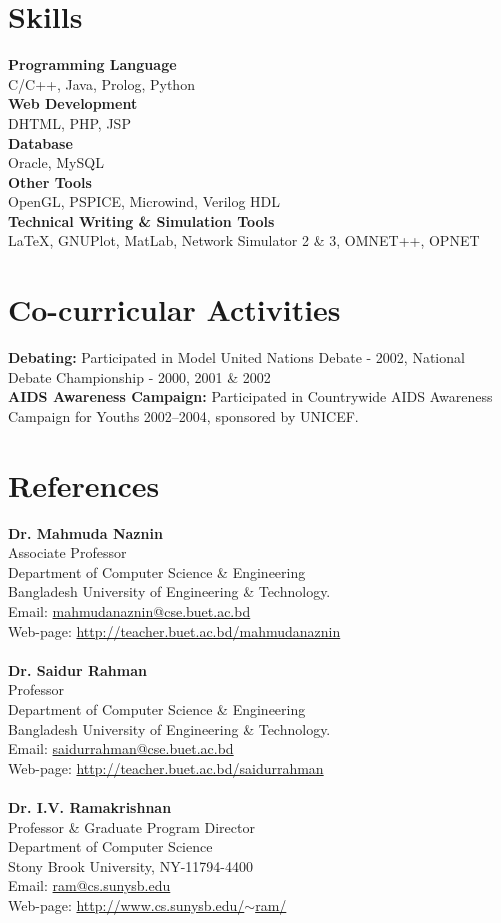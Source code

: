 \documentclass[margin,line,pifont,palatino,courier]{res}
\begin{document}
\begin{resume}
\section{\sc Skills}
\textbf{Programming Language}\\
C/C++, Java, Prolog, Python\\
\textbf{Web Development}\\
DHTML, PHP, JSP\\
\textbf{Database}\\ 
Oracle, MySQL\\
\textbf{Other Tools}\\
OpenGL, PSPICE, Microwind, Verilog HDL\\
\textbf{Technical Writing \& Simulation Tools}\\
\LaTeX{}, GNUPlot, MatLab, Network Simulator 2 \& 3, OMNET++, OPNET
\section{\sc Co-curricular Activities}
\textbf{Debating: }Participated in Model United Nations Debate - 2002, National Debate Championship
- 2000, 2001 \& 2002\\
\textbf{AIDS Awareness Campaign: }Participated in Countrywide AIDS Awareness Campaign for Youths
2002--2004, sponsored by UNICEF.
\section{\sc References}
\textbf{Dr. Mahmuda Naznin}\\
Associate Professor\\
Department of Computer Science \& Engineering \\
Bangladesh University of Engineering \& Technology. \\
Email: \href{mailto:mahmudanaznin@cse.buet.ac.bd}{mahmudanaznin@cse.buet.ac.bd}\\ 
Web-page: \href{http://teacher.buet.ac.bd/mahmudanaznin}{http://teacher.buet.ac.bd/mahmudanaznin}
\\
\\
\textbf{Dr. Saidur Rahman}\\
Professor\\
Department of Computer Science \& Engineering \\
Bangladesh University of Engineering \& Technology. \\
Email: \href{mailto:saidurrahman@cse.buet.ac.bd}{saidurrahman@cse.buet.ac.bd}\\ 
Web-page: \href{http://teacher.buet.ac.bd/saidurrahman}{http://teacher.buet.ac.bd/saidurrahman}
\\
\\
\textbf{Dr. I.V. Ramakrishnan}\\
Professor \& Graduate Program Director\\
Department of Computer Science\\
Stony Brook University, NY-11794-4400 \\
Email: \href{mailto:ram@cs.sunysb.edu}{ram@cs.sunysb.edu}\\ 
Web-page:
\href{http://www.cs.sunysb.edu/~ram/}{http://www.cs.sunysb.edu/$\sim$ram/}
\end{resume}
\end{document}
